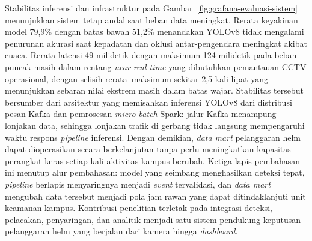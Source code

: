 Stabilitas inferensi dan infrastruktur pada Gambar~\ref{fig:grafana-evaluasi-sistem} menunjukkan sistem tetap andal saat beban data meningkat. Rerata keyakinan model 79,9\% dengan batas bawah 51,2\% menandakan YOLOv8 tidak mengalami penurunan akurasi saat kepadatan dan oklusi antar-pengendara meningkat akibat cuaca. Rerata latensi 49 milidetik dengan maksimum 124 milidetik pada beban puncak masih dalam rentang \textit{near real-time} yang dibutuhkan pemantauan CCTV operasional, dengan selisih rerata--maksimum sekitar 2,5 kali lipat yang menunjukkan sebaran nilai ekstrem masih dalam batas wajar. Stabilitas tersebut bersumber dari arsitektur yang memisahkan inferensi YOLOv8 dari distribusi pesan Kafka dan pemrosesan \textit{micro-batch} Spark: jalur Kafka menampung lonjakan data, sehingga lonjakan trafik di gerbang tidak langsung mempengaruhi waktu respons \textit{pipeline} inferensi. Dengan demikian, \textit{data mart} pelanggaran helm dapat dioperasikan secara berkelanjutan tanpa perlu meningkatkan kapasitas perangkat keras setiap kali aktivitas kampus berubah. Ketiga lapis pembahasan ini menutup alur pembahasan: model yang seimbang menghasilkan deteksi tepat, \textit{pipeline} berlapis menyaringnya menjadi \textit{event} tervalidasi, dan \textit{data mart} mengubah data tersebut menjadi pola jam rawan yang dapat ditindaklanjuti unit keamanan kampus. Kontribusi penelitian terletak pada integrasi deteksi, pelacakan, penyaringan, dan analitik menjadi satu sistem pendukung keputusan pelanggaran helm yang berjalan dari kamera hingga \textit{dashboard}.
